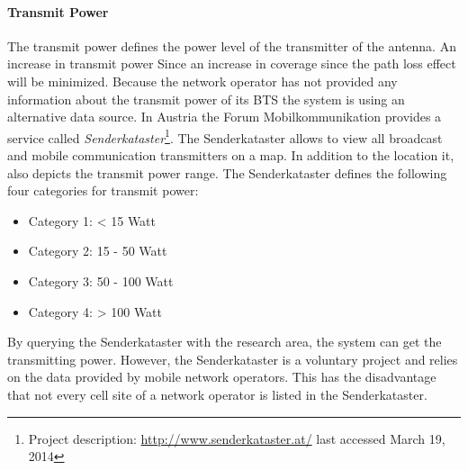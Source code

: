 \documentclass[master,english]{hgbthesis}
\begin{document}
\paragraph{Transmit Power}
The transmit power defines the power level of the transmitter of the antenna. An increase in transmit power Since an increase in coverage since the path loss effect will be minimized. Because the network operator has not provided any information about the transmit power of its BTS the system is using an alternative data source. In Austria the Forum Mobilkommunikation provides a service called \emph{Senderkataster}\footnote{Project description: \url{http://www.senderkataster.at/} last accessed March 19, 2014}. The Senderkataster allows to view all broadcast and mobile communication transmitters on a map. In addition to the location it, also depicts the transmit power range. The Senderkataster defines the following four categories for transmit power:
\begin{itemize}
	\item Category 1: < 15 Watt
	\item Category 2: 15 - 50 Watt
	\item Category 3: 50 - 100 Watt
	\item Category 4: > 100 Watt
\end{itemize}
By querying the Senderkataster with the research area, the system can get the transmitting power. However, the Senderkataster is a voluntary project and relies on the data provided by mobile network operators. This has the disadvantage that not every cell site of a network operator is listed in the Senderkataster.
\end{document}
